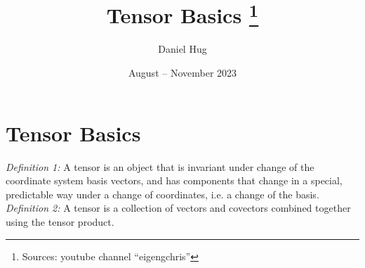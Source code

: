 \documentclass[12pt,oneside,a4paper]{article}
\title{Tensor Basics \footnote{Sources: youtube channel ``eigengchris''}}
\author{Daniel Hug}
\date{August -- November 2023}
\begin{document}
\maketitle


\setlength{\parindent}{0pt}

\section{Tensor Basics}

\emph{Definition 1:} A tensor is an object that is invariant under change of the
coordinate system basis vectors, and has components that change in a special, predictable
way under a change of coordinates, i.e. a change of the basis. \\

\emph{Definition 2:} A tensor is a collection of vectors and covectors combined together
using the tensor product. \\

\newpage







\end{document}
